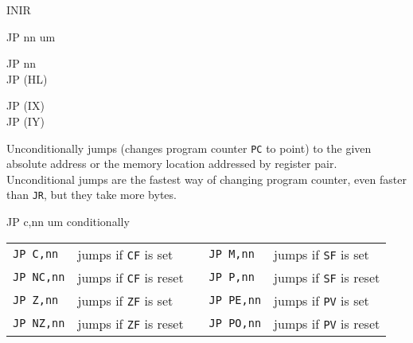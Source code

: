 \begin{basedescript}{
	\desclabelstyle{\multilinelabel}
	\desclabelwidth{3cm}}
\begin{DetailItem}{INIR}
	\end{DetailItem}

	\pagebreak
	\begin{DetailItem}{JP nn}
		{um}
		{}

		\begin{DetailVariants}
			JP nn\\
			JP (HL)
			
			\columnbreak
			JP (IX)\\
			JP (IY)
		\end{DetailVariants}

		Unconditionally jumps (changes program counter {\tt PC} to point) to the given absolute address or the memory location addressed by register pair. Unconditional jumps are the fastest way of changing program counter, even faster than {\tt JR}, but they take more bytes.

		\begin{DetailEffects}
			\FlagsJPnn
		\end{DetailEffects}
				
		\begin{DetailTiming}
		\end{DetailTiming}

	\end{DetailItem}

	\begin{DetailItem}{JP c,nn}
		{um conditionally}
		{}

		\vspace{1ex} %
		\begin{tabular}{@{}llcll}			
			{\tt JP C,nn} & jumps if {\tt CF} is set & &
				{\tt JP M,nn} & jumps if {\tt SF} is set\\

			{\tt JP NC,nn} & jumps if {\tt CF} is reset & &
				{\tt JP P,nn} & jumps if {\tt SF} is reset\\

			{\tt JP Z,nn} & jumps if {\tt ZF} is set & &
				{\tt JP PE,nn} & jumps if {\tt PV} is set\\

			{\tt JP NZ,nn} & jumps if {\tt ZF} is reset & &
				{\tt JP PO,nn} & jumps if {\tt PV} is reset\\
		\end{tabular}


\end{DetailItem}
\end{basedescript}
